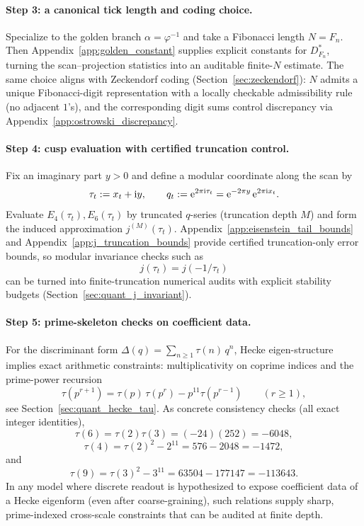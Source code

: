 \paragraph{Step 3: a canonical tick length and coding choice.}
Specialize to the golden branch $\alpha=\varphi^{-1}$ and take a Fibonacci length $N=F_n$.
Then Appendix~\ref{app:golden_constant} supplies explicit constants for $D_{F_n}^\ast$, turning the scan--projection statistics into an auditable finite-$N$ estimate.
The same choice aligns with Zeckendorf coding (Section~\ref{sec:zeckendorf}): $N$ admits a unique Fibonacci-digit representation with a locally checkable admissibility rule (no adjacent $1$'s), and the corresponding digit sums control discrepancy via Appendix~\ref{app:ostrowski_discrepancy}.

\paragraph{Step 4: cusp evaluation with certified truncation control.}
Fix an imaginary part $y>0$ and define a modular coordinate along the scan by
\begin{equation}
\tau_t := x_t+\mathrm{i} y,\qquad q_t := \mathrm{e}^{2\pi\mathrm{i}\tau_t}=\mathrm{e}^{-2\pi y}\,\mathrm{e}^{2\pi\mathrm{i} x_t}.
\end{equation}
Evaluate $E_4(\tau_t),E_6(\tau_t)$ by truncated $q$-series (truncation depth $M$) and form the induced approximation $j^{(M)}(\tau_t)$.
Appendix~\ref{app:eisenstein_tail_bounds} and Appendix~\ref{app:j_truncation_bounds} provide certified truncation-only error bounds, so modular invariance checks such as
\begin{equation}
j(\tau_t)=j(-1/\tau_t)
\end{equation}
can be turned into finite-truncation numerical audits with explicit stability budgets (Section~\ref{sec:quant_j_invariant}).

\paragraph{Step 5: prime-skeleton checks on coefficient data.}
For the discriminant form $\Delta(q)=\sum_{n\ge 1}\tau(n)\,q^n$, Hecke eigen-structure implies exact arithmetic constraints:
multiplicativity on coprime indices and the prime-power recursion
\begin{equation}
\tau(p^{r+1})=\tau(p)\,\tau(p^r)-p^{11}\tau(p^{r-1})\qquad (r\ge 1),
\end{equation}
see Section~\ref{sec:quant_hecke_tau}.
As concrete consistency checks (all exact integer identities),
\begin{equation}
\tau(6)=\tau(2)\tau(3)=(-24)(252)=-6048,
\end{equation}
\begin{equation}
\tau(4)=\tau(2)^2-2^{11}=576-2048=-1472,
\end{equation}
and
\begin{equation}
\tau(9)=\tau(3)^2-3^{11}=63504-177147=-113643.
\end{equation}
In any model where discrete readout is hypothesized to expose coefficient data of a Hecke eigenform (even after coarse-graining), such relations supply sharp, prime-indexed cross-scale constraints that can be audited at finite depth.

